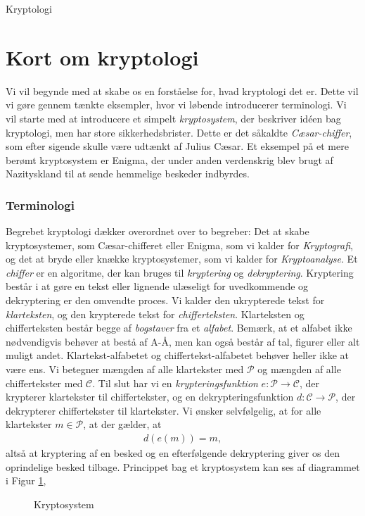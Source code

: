 
\begin{center}
	\Huge
	Kryptologi
\end{center}

\section{Kort om kryptologi}


Vi vil begynde med at skabe os en forståelse for, hvad kryptologi det er. Dette vil vi gøre gennem tænkte eksempler, hvor vi løbende introducerer terminologi. Vi vil starte med at introducere et simpelt \textit{kryptosystem}, der beskriver idéen bag kryptologi, men har store sikkerhedsbrister. Dette er det såkaldte \textit{Cæsar-chiffer}, som efter sigende skulle være udtænkt af Julius Cæsar. Et eksempel på et mere berømt kryptosystem er Enigma, der under anden verdenskrig blev brugt af Nazityskland til at sende hemmelige beskeder indbyrdes. 

\subsubsection*{Terminologi}
Begrebet kryptologi dækker overordnet over to begreber: Det at skabe kryptosystemer, som Cæsar-chifferet eller Enigma, som vi kalder for \textit{Kryptografi}, og det at bryde eller knække kryptosystemer, som vi kalder for \textit{Kryptoanalyse}. Et \textit{chiffer} er en algoritme, der kan bruges til \textit{kryptering} og \textit{dekryptering}. Kryptering består i at gøre en tekst eller lignende ulæseligt for uvedkommende og dekryptering er den omvendte proces. Vi kalder den ukrypterede tekst for \textit{klarteksten}, og den krypterede tekst for \textit{chifferteksten}. Klarteksten og chifferteksten består begge af \textit{bogstaver} fra et \textit{alfabet}. Bemærk, at et alfabet ikke nødvendigvis behøver at bestå af A-Å, men kan også består af tal, figurer eller alt muligt andet. Klartekst-alfabetet og chiffertekst-alfabetet behøver heller ikke at være ens. Vi betegner mængden af alle klartekster med $\mathscr{P}$ og mængden af alle chiffertekster med $\mathscr{C}$. Til slut har vi en \textit{krypteringsfunktion} $e:\mathscr{P} \to \mathscr{C}$, der krypterer klartekster til chiffertekster, og en dekrypteringsfunktion $d:\mathscr{C} \to \mathscr{P}$, der dekrypterer chiffertekster til klartekster. Vi ønsker selvfølgelig, at for alle klartekster $m\in \mathscr{P}$, at der gælder, at 
\begin{align*}
d(e(m)) = m,
\end{align*}
altså at kryptering af en besked og en efterfølgende dekryptering giver os den oprindelige besked tilbage. Princippet bag et kryptosystem kan ses af diagrammet i Figur \ref{fig:krypto},
\begin{figure}[H]
\centering
{}
\caption{Kryptosystem}
\label{fig:krypto}
\end{figure}

